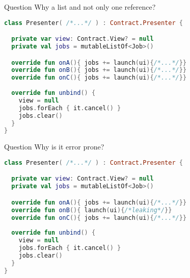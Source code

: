 \documentclass[10pt]{beamer}
\begin{document}
\begin{frame}[fragile]
	\begin{alertblock}{Question}
Why a list and not only one reference?
\end{alertblock}
\end{frame}
\begin{frame}[fragile]
\begin{lstlisting}[language=Kotlin, basicstyle=\ttfamily]
class Presenter( /*...*/ ) : Contract.Presenter {

  private var view: Contract.View? = null
  private val jobs = mutableListOf<Job>()

  override fun onA(){ jobs += launch(ui){/*...*/}}
  override fun onB(){ jobs += launch(ui){/*...*/}}
  override fun onC(){ jobs += launch(ui){/*...*/}}
  
  override fun unbind() {
    view = null
    jobs.forEach { it.cancel() } 
    jobs.clear() 
  }
}
\end{lstlisting}
\end{frame}

\begin{frame}[fragile]
	\begin{alertblock}{Question}
Why is it error prone?
\end{alertblock}
\end{frame}

\begin{frame}[fragile]
\begin{lstlisting}[language=Kotlin, basicstyle=\ttfamily]
class Presenter( /*...*/ ) : Contract.Presenter {

  private var view: Contract.View? = null
  private val jobs = mutableListOf<Job>()

  override fun onA(){ jobs += launch(ui){/*...*/}}
  override fun onB(){ launch(ui){/*leaking*/}}
  override fun onC(){ jobs += launch(ui){/*...*/}}
  
  override fun unbind() {
    view = null
    jobs.forEach { it.cancel() } 
    jobs.clear() 
  }
}
\end{lstlisting}
\end{frame}




\begin{frame}[fragile]
\begin{lstlisting}[language=Kotlin, basicstyle=\ttfamily]

\end{lstlisting}
\end{frame}
\end{document}
